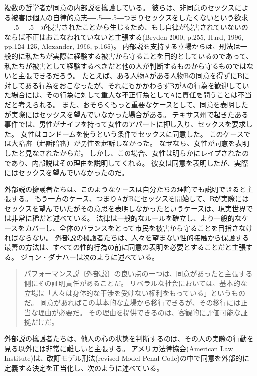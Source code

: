 \documentclass[paper=a4,book,openany]{jlreq}
\def\DDASH{―\kern-.5\zw―\kern-.5\zw―} %
\begin{document}
複数の哲学者が同意の内部説を擁護している。
彼らは、非同意のセックスによる被害は個人の自律的意志{\DDASH}つまりセックスをしたくないという欲求{\DDASH}が侵害されたことから生じるため、もし自律が侵害されていないのならば不正はおこなわれていないと主張する(Bryden 2000, p.255, Hurd, 1996, pp.124-125, Alexander, 1996, p.165)。
\nocite{bryden00:_redef_rape}\nocite{hurd96:_moral_magic_consen}\nocite{alexander96:_moral_magic_consen_ii}
内部説を支持する立場からは、刑法は一般的に私たちが実際に経験する被害から守ることを目的としているのであって、私たちが被害として経験するべきだと他の人が判断するものから守るものではないと主張できるだろう。
たとえば、ある人物Aがある人物Bの同意を得ずにBに対してある行為をおこなったが、それにもかかわらずBがAの行為を歓迎していた場合には、その行為に対して重大な不正行為としてAに責任を問うことは不当だと考えられる。
また、おそらくもっと重要なケースとして、同意を表明したが実際にはセックスを望んでいなかった場合がある。
テキサス州で起きたある事件では、男性がナイフを持って女性のアパートに押し入り、セックスを要求した。
女性はコンドームを使うという条件でセックスに同意した。
このケースでは大陪審（起訴陪審）が男性を起訴しなかった。
なぜなら、女性が同意を表明したと見なされたからだ。
しかし、この場合、女性は明らかにレイプされたのであり、内部説はその理由を説明してくれる。
彼女は同意を表明したが、実際にはセックスを望んでいなかったのだ\citep[cf.][p.137]{hurd96:_moral_magic_consen}。

外部説の擁護者たちは、このようなケースは自分たちの理論でも説明できると主張する。
もう一方のケース、つまりAがBにセックスを開始して、Bが実際にはセックスを望んでいたがその意思を表明しなかったというケースは、現実世界では非常に稀だと述べている。
法律は一般的なルールを確立し、より一般的なケースをカバーし、全体のバランスをとって市民を被害から守ることを目指さなければならない。
外部説の擁護者たちは、人々を望まない性的接触から保護する最善の方法は、すべての性的行為の前に同意の表明を必要とすることだと主張する。
ジョン・ダナハーは次のように述べている。

\begin{quote}
  パフォーマンス説〔外部説〕の良い点の一つは、同意があったと主張する側にその証明責任があることだ。
リベラルな社会においては、基本的な立場は「人々は身体的な干渉を受けない権利をもっている」というものだ。
同意があればこの基本的な立場から移行できるが、その移行には正当な理由が必要だ。
その理由を提供できるのは、客観的に評価可能な証拠だけだ。
\citep{danaher13:_some_notes_consen_sexual_offen_part_one}
\end{quote}

外部説の擁護者たちは、他人の心の状態を判断するのは、その人の実際の行動を見る以外には非常に難しいと主張する。
アメリカ法律協会(American Law Institute)は、改訂モデル刑法(revised Model Penal Code)の中で同意を外部的に定義する決定を正当化し、次のように述べている。
\end{document}
